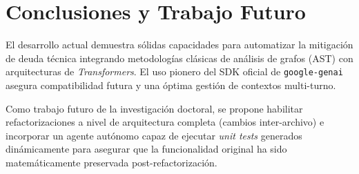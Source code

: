 \documentclass[12pt,a4paper]{article}
\begin{document}
\section{Conclusiones y Trabajo Futuro}

El desarrollo actual demuestra sólidas capacidades para automatizar la mitigación de deuda técnica integrando metodologías clásicas de análisis de grafos (AST) con arquitecturas de \textit{Transformers}. El uso pionero del SDK oficial de \texttt{google-genai} asegura compatibilidad futura y una óptima gestión de contextos multi-turno.

Como trabajo futuro de la investigación doctoral, se propone habilitar refactorizaciones a nivel de arquitectura completa (cambios inter-archivo) e incorporar un agente autónomo capaz de ejecutar \textit{unit tests} generados dinámicamente para asegurar que la funcionalidad original ha sido matemáticamente preservada post-refactorización.
\end{document}
